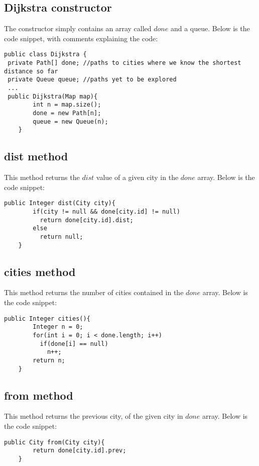 \documentclass[a4paper,11pt]{article}
\begin{document}
\subsection*{Dijkstra constructor}
The constructor simply contains an array called $done$ and a queue. Below is the code snippet, with comments explaining the code:

\begin{verbatim}
public class Dijkstra { 
 private Path[] done; //paths to cities where we know the shortest distance so far
 private Queue queue; //paths yet to be explored
 ...
 public Dijkstra(Map map){
        int n = map.size();
        done = new Path[n];
        queue = new Queue(n);
    }
\end{verbatim}

\subsection*{dist method}
This method returns the $dist$ value of a given city in the $done$ array. Below is the code snippet:

\begin{verbatim}
public Integer dist(City city){
        if(city != null && done[city.id] != null)
          return done[city.id].dist;
        else
          return null;
    }
\end{verbatim}

\subsection*{cities method}
This method returns the number of cities contained in the $done$ array. Below is the code snippet:

\begin{verbatim}
public Integer cities(){
        Integer n = 0;
        for(int i = 0; i < done.length; i++)
          if(done[i] == null)
            n++;
        return n;
    }
\end{verbatim}

\subsection*{from method}
This method returns the previous city, of the given city in $done$ array. Below is the code snippet:

\begin{verbatim}
public City from(City city){
        return done[city.id].prev;
    }
\end{verbatim}
\end{document}
